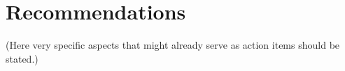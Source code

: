 \section{Recommendations}

(Here very specific aspects that might already serve as action items should be stated.)
